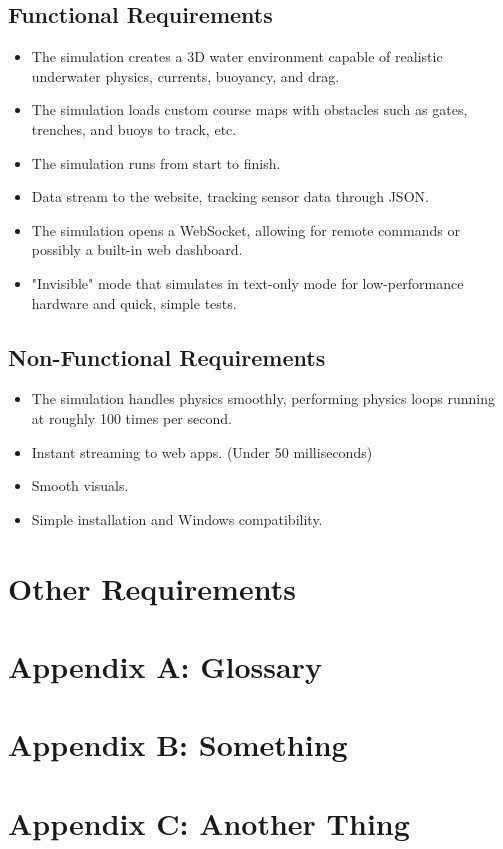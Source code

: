 \documentclass[12pt]{article}
\begin{document}
\subsection{Functional Requirements} 
\begin{itemize} 
	\item The simulation creates a 3D water environment capable of realistic underwater physics, currents, buoyancy, and drag. 
	\item The simulation loads custom course maps with obstacles such as gates, trenches, and buoys to track, etc. 
	\item The simulation runs from start to finish. 
	\item Data stream to the website, tracking sensor data through JSON. 
	\item The simulation opens a WebSocket, allowing for remote commands or possibly a built-in web dashboard. 
	\item "Invisible" mode that simulates in text-only mode for low-performance hardware and quick, simple tests. 
\end{itemize} 

\subsection{Non-Functional Requirements} 
\begin{itemize} 
	\item The simulation handles physics smoothly, performing physics loops running at roughly 100 times per second. 
	\item Instant streaming to web apps. (Under 50 milliseconds) 
	\item Smooth visuals. 
	\item Simple installation and Windows compatibility. 
\end{itemize} 

\newpage 
\section{Other Requirements} 

\newpage 
\section{Appendix A: Glossary} 

\newpage
\section{Appendix B: Something} 

\newpage
\section{Appendix C: Another Thing} 
\end{document}
